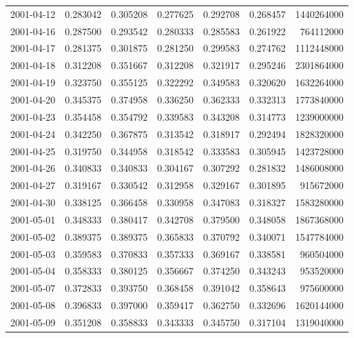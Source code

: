 \begin{tabular}{lrrrrrr}
2001-04-12 &    0.283042 &    0.305208 &    0.277625 &    0.292708 &    0.268457 &  1440264000 \\
2001-04-16 &    0.287500 &    0.293542 &    0.280333 &    0.285583 &    0.261922 &   764112000 \\
2001-04-17 &    0.281375 &    0.301875 &    0.281250 &    0.299583 &    0.274762 &  1112448000 \\
2001-04-18 &    0.312208 &    0.351667 &    0.312208 &    0.321917 &    0.295246 &  2301864000 \\
2001-04-19 &    0.323750 &    0.355125 &    0.322292 &    0.349583 &    0.320620 &  1632264000 \\
2001-04-20 &    0.345375 &    0.374958 &    0.336250 &    0.362333 &    0.332313 &  1773840000 \\
2001-04-23 &    0.354458 &    0.354792 &    0.339583 &    0.343208 &    0.314773 &  1239000000 \\
2001-04-24 &    0.342250 &    0.367875 &    0.313542 &    0.318917 &    0.292494 &  1828320000 \\
2001-04-25 &    0.319750 &    0.344958 &    0.318542 &    0.333583 &    0.305945 &  1423728000 \\
2001-04-26 &    0.340833 &    0.340833 &    0.304167 &    0.307292 &    0.281832 &  1486008000 \\
2001-04-27 &    0.319167 &    0.330542 &    0.312958 &    0.329167 &    0.301895 &   915672000 \\
2001-04-30 &    0.338125 &    0.366458 &    0.330958 &    0.347083 &    0.318327 &  1583280000 \\
2001-05-01 &    0.348333 &    0.380417 &    0.342708 &    0.379500 &    0.348058 &  1867368000 \\
2001-05-02 &    0.389375 &    0.389375 &    0.365833 &    0.370792 &    0.340071 &  1547784000 \\
2001-05-03 &    0.359583 &    0.370833 &    0.357333 &    0.369167 &    0.338581 &   960504000 \\
2001-05-04 &    0.358333 &    0.380125 &    0.356667 &    0.374250 &    0.343243 &   953520000 \\
2001-05-07 &    0.372833 &    0.393750 &    0.368458 &    0.391042 &    0.358643 &   975600000 \\
2001-05-08 &    0.396833 &    0.397000 &    0.359417 &    0.362750 &    0.332696 &  1620144000 \\
2001-05-09 &    0.351208 &    0.358833 &    0.343333 &    0.345750 &    0.317104 &  1319040000 \\

\end{tabular}
